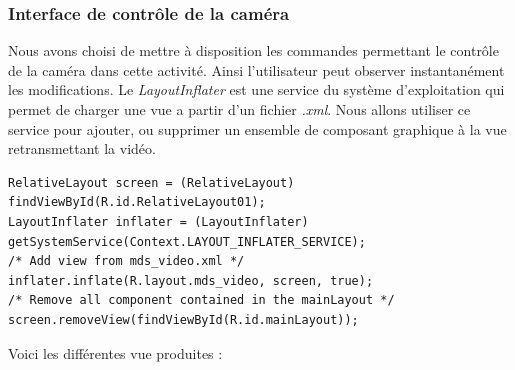 \subsubsection{Interface de contrôle de la caméra}
Nous avons choisi de mettre à disposition les commandes permettant le contrôle
de la caméra dans cette activité. Ainsi l'utilisateur peut observer instantanément les
modifications.\newline\newline
\indent Le \textit{LayoutInflater} est une service du système d'exploitation qui
permet de charger une vue a partir d'un fichier \textit{.xml}. Nous allons utiliser ce
service pour ajouter, ou supprimer un ensemble de composant graphique à la vue
retransmettant la vidéo.
\begin{lstlisting}[caption={LayoutInflater utilisation}]
RelativeLayout screen = (RelativeLayout) findViewById(R.id.RelativeLayout01);
LayoutInflater inflater = (LayoutInflater) getSystemService(Context.LAYOUT_INFLATER_SERVICE);
/* Add view from mds_video.xml */
inflater.inflate(R.layout.mds_video, screen, true);
/* Remove all component contained in the mainLayout */
screen.removeView(findViewById(R.id.mainLayout));
\end{lstlisting}
Voici les différentes vue produites :

